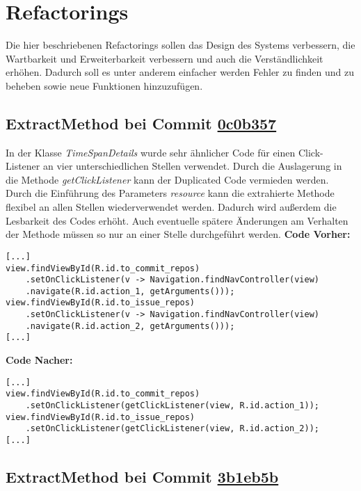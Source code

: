 \newpage
\section{Refactorings}
\label{sec:Refactorings}

Die hier beschriebenen Refactorings sollen das Design des Systems verbessern, die Wartbarkeit und Erweiterbarkeit verbessern und auch die Verständlichkeit erhöhen.
Dadurch soll es unter anderem einfacher werden Fehler zu finden und zu beheben sowie neue Funktionen hinzuzufügen.


\subsection{ExtractMethod bei Commit \href{https://github.com/lukaspanni/OpenSourceStats/commit/0c0b357dee742575d8465ae26e64152bfecbf5ab} {0c0b357}}
\label{sec:ExtractMethod_TimeSpanDetails}

In der Klasse \textit{TimeSpanDetails} wurde sehr ähnlicher Code für einen Click-Listener an vier unterschiedlichen Stellen verwendet. Durch die Auslagerung in die Methode \textit{getClickListener}  kann der Duplicated Code vermieden werden. Durch die Einführung des Parameters \textit{resource} kann die extrahierte Methode flexibel an allen Stellen wiederverwendet werden. Dadurch wird außerdem die Lesbarkeit des Codes erhöht.
Auch eventuelle spätere Änderungen am Verhalten der Methode müssen so nur an einer Stelle durchgeführt werden.
\newline
\textbf{Code Vorher:} 
\begin{lstlisting}[breaklines=false]
[...]
view.findViewById(R.id.to_commit_repos)
    .setOnClickListener(v -> Navigation.findNavController(view)
    .navigate(R.id.action_1, getArguments()));
view.findViewById(R.id.to_issue_repos)
    .setOnClickListener(v -> Navigation.findNavController(view)
    .navigate(R.id.action_2, getArguments()));
[...]
\end{lstlisting}
\textbf{Code Nacher:} 
\begin{lstlisting}[breaklines=false]
[...]
view.findViewById(R.id.to_commit_repos)
    .setOnClickListener(getClickListener(view, R.id.action_1));
view.findViewById(R.id.to_issue_repos)
    .setOnClickListener(getClickListener(view, R.id.action_2));
[...]
\end{lstlisting}

\newpage
\subsection{ExtractMethod bei Commit \href{https://github.com/lukaspanni/OpenSourceStats/commit/3b1eb5bf6750c3ccaeb05962ec8a8ae743adbf2c} {3b1eb5b}}
\label{sec:ExtractMethod_Repository}

